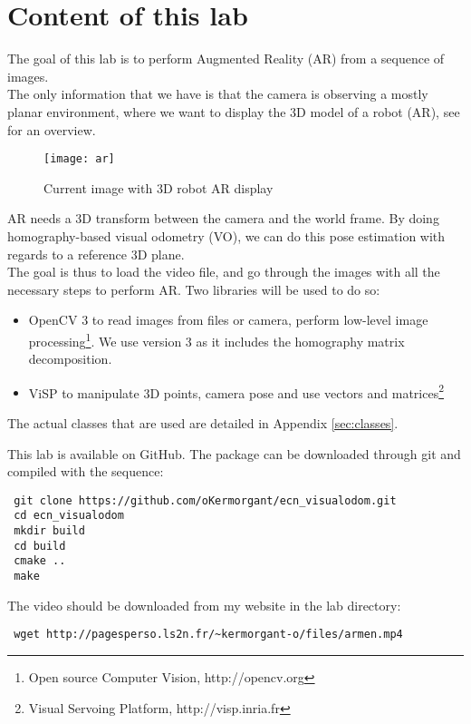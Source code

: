 \documentclass{ecnreport}
\begin{document}



\section{Content of this lab}

The goal of this lab is to perform Augmented Reality (AR) from a sequence of images.\\
The only information that we have is that the camera is observing a mostly planar environment, 
where we want to display the 3D model of a robot (AR), see  for an overview.

\begin{figure}[h!]
\centering\label{fig:ar}
 \texttt{[image: ar]}
 \caption{Current image with 3D robot AR display}
\end{figure}

AR needs a 3D transform between the camera and the world frame. By doing homography-based visual odometry (VO), we can do this pose estimation 
with regards to a reference 3D plane. \\
The goal is thus to load the video file, and go through the images with all the necessary steps to perform AR. Two libraries will be used to do so: 
\begin{itemize}
 \item OpenCV 3 to read images from files or camera, perform low-level image processing\footnote{Open source Computer Vision, http://opencv.org}. We use version 3 as it includes
 the homography matrix decomposition. 
 \item ViSP to manipulate 3D points, camera pose and use vectors and matrices\footnote{Visual Servoing Platform, http://visp.inria.fr}
\end{itemize}
The actual classes that are used are detailed in Appendix \ref{sec:classes}.

This lab is available on GitHub. The package can be downloaded through git and compiled with the sequence:
\begin{center}\cppstyle
\begin{lstlisting}
 git clone https://github.com/oKermorgant/ecn_visualodom.git
 cd ecn_visualodom
 mkdir build
 cd build
 cmake ..
 make
\end{lstlisting}
\end{center} 

The video should be downloaded from my website in the lab directory:
\begin{center}\cppstyle
\begin{lstlisting}
 wget http://pagesperso.ls2n.fr/~kermorgant-o/files/armen.mp4
\end{lstlisting}
\end{center} 
\end{document}
